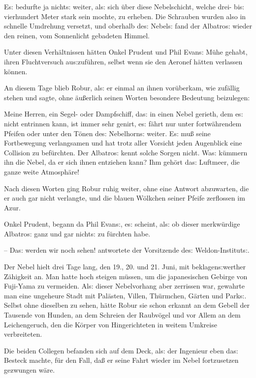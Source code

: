 \documentclass[oneside,12pt]{book}
\newcommand{\s}{s:}
\begin{document}
E{\s} bedurfte ja nicht{\s} weiter, al{\s} sich \"uber diese
Nebelschicht, welche drei- bi{\s} vierhundert Meter stark sein
mochte, zu erheben. Die Schrauben wurden also in schnelle Umdrehung
versetzt, und oberhalb de{\s} Nebel{\s} fand der
{\glqq}Albatro{\s}{\grqq} wieder den reinen, vom Sonnenlicht
gebadeten Himmel.

Unter diesen Verh\"altnissen h\"atten Onkel Prudent und Phil Evan{\s}
M\"uhe gehabt, ihren Fluchtversuch au{\s}zuf\"uhren, selbst wenn sie
den Aeronef h\"atten verlassen k\"onnen.

An diesem Tage blieb Robur, al{\s} er einmal an ihnen vor\"uberkam,
wie zuf\"allig stehen und sagte, ohne \"au{\ss}erlich seinen Worten
besondere Bedeutung beizulegen:

{\glqq}Meine Herren, ein Segel- oder Dampfschiff, da{\s} in einen
Nebel gerieth, dem e{\s} nicht entrinnen kann, ist immer sehr genirt,
e{\s} f\"ahrt nur unter fortw\"ahrendem Pfeifen oder unter den
T\"onen de{\s} Nebelhorn{\s} weiter. E{\s} mu{\ss} seine Fortbewegung
verlangsamen und hat trotz aller Vorsicht jeden Augenblick eine
Collision zu bef\"urchten. Der {\glqq}Albatro{\s}{\grqq} kennt solche
Sorgen nicht. Wa{\s} k\"ummern ihn die Nebel, da er sich ihnen
ent\/ziehen kann? Ihm geh\"ort da{\s} Luftmeer, die ganze weite
Atmosph\"are!{\grqq}

Nach diesen Worten ging Robur ruhig weiter, ohne eine Antwort
abzuwarten, die er auch gar nicht verlangte, und die blauen
W\"olkchen seiner Pfeife zerflossen im Azur.

{\glqq}Onkel Prudent, begann da Phil Evan{\s}, e{\s} scheint, al{\s}
ob dieser merkw\"urdige {\glqq}Albatro{\s}{\grqq} ganz und gar
nicht{\s} zu f\"urchten habe.

-- Da{\s} werden wir noch sehen!{\grqq} antwortete der Vorsitzende
de{\s} Weldon-Institut{\s}.

Der Nebel hielt drei Tage lang, den 19., 20. und 21. Juni, mit
beklagen{\s}werther Z\"ahigkeit an. Man hatte hoch steigen m\"ussen,
um die japanesischen Gebirge von Fuji-Yama zu vermeiden. Al{\s}
dieser Nebelvorhang aber zerrissen war, gewahrte man eine ungeheure
Stadt mit Pal\"asten, Villen, Th\"urmchen, G\"arten und Park{\s}.
Selbst ohne dieselben zu sehen, h\"atte Robur sie schon erkannt an
dem Gebell der Tausende von Hunden, an dem Schreien der Raubv\"ogel
und vor Allem an dem Leichengeruch, den die K\"orper von
Hingerichteten in weitem Umkreise verbreiteten.

Die beiden Collegen befanden sich auf dem Deck, al{\s} der Ingenieur
eben da{\s} Besteck machte, f\"ur den Fall, da{\ss} er seine Fahrt
wieder im Nebel fort\/zusetzen gezwungen w\"are.
\end{document}
